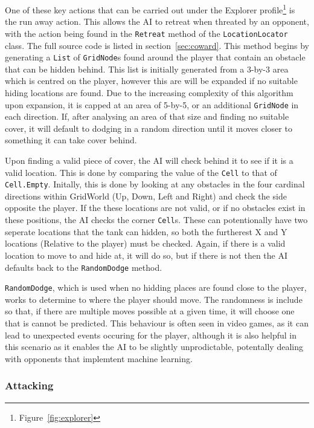 \documentclass[11pt]{article}
\begin{document}
One of these key actions that can be carried out under the Explorer profile\footnote{Figure~\ref{fig:explorer}} is the run away action. This allows the AI to retreat when threated by an opponent, with the action being found in the \verb|Retreat| method of the \verb|LocationLocator| class. The full source code is listed in section~\ref{sec:coward}. This method begins by generating a \verb|List| of \verb|GridNode|s found around the player that contain an obstacle that can be hidden behind. This list is initially generated from a 3-by-3 area which is centred on the player, however this are will be expanded if no suitable hiding locations are found. Due to the increasing complexity of this algorithm upon expansion\cite{GeorgeComplex}, it is capped at an area of 5-by-5, or an additional \verb|GridNode| in each direction. If, after analysing an area of that size and finding no suitable cover, it will default to dodging in a random direction until it moves closer to something it can take cover behind.

Upon finding a valid piece of cover, the AI will check behind it to see if it is a valid location. This is done by comparing the value of the \verb|Cell| to that of \verb|Cell.Empty|. Initally, this is done by looking at any obstacles in the four cardinal directions within GridWorld (Up, Down, Left and Right) and check the side opposite the player. If the these locations are not valid, or if no obstacles exist in these positions, the AI checks the corner \verb|Cell|s. These can potentionally have two seperate locations that the tank can hidden, so both the furtherest X and Y locations (Relative to the player) must be checked. Again, if there is a valid location to move to and hide at, it will do so, but if there is not then the AI defaults back to the \verb|RandomDodge| method.

\verb|RandomDodge|, which is used when no hidding places are found close to the player, works to determine to where the player should move. The randomness is include so that, if there are multiple moves possible at a given time, it will choose one that is cannot be predicted. This behaviour is often seen in video games\cite{GeorgeRandom}, as it can lead to unexpected events occuring for the player, although it is also helpful in this scenario as it enables the AI to be slightly unprodictable, potentally dealing with opponents that implemtent machine learning.

\subsubsection{Attacking}
\end{document}
